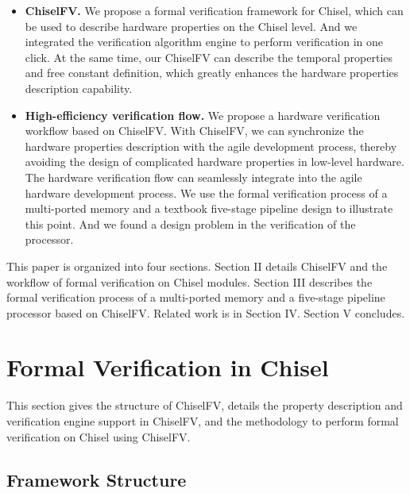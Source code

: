 \documentclass[conference]{IEEEtran}
\theoremstyle{definition}
\begin{document}
\begin{itemize}
    \item \textbf{ChiselFV.} We propose a formal verification framework for Chisel, which can be used to describe hardware properties on the Chisel level. And we integrated the verification algorithm engine to perform verification in one click. At the same time, our ChiselFV can describe the temporal properties and free constant definition, which greatly enhances the hardware properties description capability.
    \item \textbf{High-efficiency verification flow.} We propose a hardware verification workflow based on ChiselFV. With ChiselFV, we can synchronize the hardware properties description with the agile development process, thereby avoiding the design of complicated hardware properties in low-level hardware. The hardware verification flow can seamlessly integrate into the agile hardware development process. 
    We use the formal verification process of a multi-ported memory and a textbook five-stage pipeline design to illustrate this point.
    And we found a design problem in the verification of the processor.
\end{itemize}

This paper is organized into four sections. 
Section II details ChiselFV and the workflow of formal verification on Chisel modules.
Section III describes the formal verification process of a multi-ported memory and a five-stage pipeline processor based on ChiselFV.
Related work is in Section IV. Section V concludes.

\section{Formal Verification in Chisel}

This section gives the structure of ChiselFV, details the property description and verification engine support in ChiselFV, and the methodology to perform formal verification on Chisel using ChiselFV.

\subsection{Framework Structure}
\end{document}
